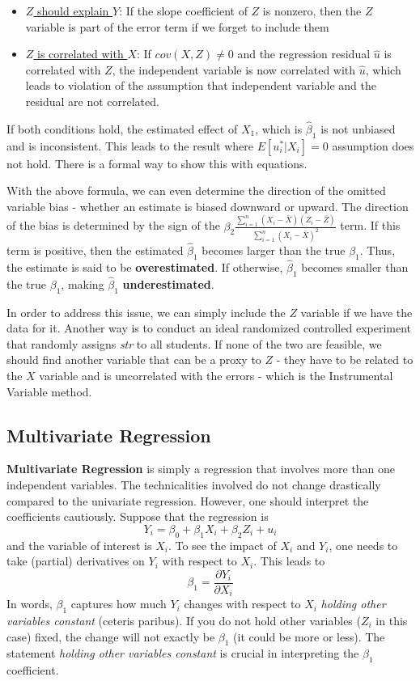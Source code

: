 \documentclass[12pt]{article}
\theoremstyle{definition}
\theoremstyle{property}
\theoremstyle{assumption}
\theoremstyle{example}
\theoremstyle{comment}
\begin{document}
\begin{itemize}
\item \underline{$Z$ should explain $Y$}: If the slope coefficient of $Z$ is nonzero, then the $Z$ variable is part of the error term if we forget to include them
\item \underline{$Z$ is correlated with $X$}: If $cov(X,Z)\neq0$ and the regression residual $\hat{u}$ is correlated with $Z$, the independent variable is now correlated with $\hat{u}$, which leads to violation of the assumption that independent variable and the residual are not correlated.
\end{itemize} \par\medskip
If both conditions hold, the estimated effect of $X_1$, which is $\hat{\beta}_1$ is not unbiased and is inconsistent. This leads to the result where $E[u^*_i|X_i]=0$ assumption does not hold. There is a formal way to show this with equations.
\par\medskip
With the above formula, we can even determine the direction of the omitted variable bias - whether an estimate is biased downward or upward. The direction of the bias is determined by the sign of the $\beta_2\frac{\sum_{i=1}^n(X_i-\bar{X})(Z_i-\bar{Z})}{\sum_{i=1}^n(X_i-\bar{X})^2}$ term. If this term is positive, then the estimated $\hat{\beta}_1$ becomes larger than the true $\beta_1$. Thus, the estimate is said to be \textbf{overestimated}. If otherwise, $\hat{\beta}_1$ becomes smaller than the true $\beta_1$, making $\hat{\beta}_1$ \textbf{underestimated}.
\par\medskip
In order to address this issue, we can simply include the $Z$ variable if we have the data for it. Another way is to conduct an ideal randomized controlled experiment that randomly assigns \textit{str} to all students. If none of the two are feasible, we should find another variable that can be a proxy to $Z$ - they have to be related to the $X$ variable and is uncorrelated with the errors - which is the Instrumental Variable method. \par\medskip

\subsection{Multivariate Regression}
\textbf{Multivariate Regression} is simply a regression that involves more than one independent variables. The technicalities involved do not change drastically compared to the univariate regression. However, one should interpret the coefficients cautiously. Suppose that the regression is
\[
Y_i = \beta_0 + \beta_1 X_i + \beta_2 Z_i+u_i
\]
and the variable of interest is $X_i$. To see the impact of $X_i$ and $Y_i$, one needs to take (partial) derivatives on $Y_i$ with respect to $X_i$. This leads to
\[
\beta_1 = \frac{\partial Y_i}{\partial X_i}
\]
In words, $\beta_1$ captures how much $Y_i$ changes with respect to $X_i$ \emph{holding other variables constant} (ceteris paribus). If you do not hold other variables ($Z_i$ in this case) fixed, the change will not exactly be $\beta_1$ (it could be more or less). The statement \emph{holding other variables constant} is crucial in interpreting the $\beta_1$ coefficient.
\par\medskip

\end{document}
